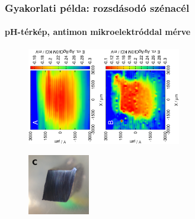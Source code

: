 \documentclass{beamer}
\begin{document}
\begin{frame}
\frametitle{Gyakorlati példa: rozsdásodó szénacél}
\framesubtitle{pH-térkép, antimon mikroelektróddal mérve}
\begin{figure}
\centering
\includegraphics[trim = 10mm 30mm 0mm 10mm, clip, width=0.3\textwidth, angle=-90]{16012906.eps}\includegraphics[trim = 10mm 30mm 0mm 10mm, clip, width=0.3\textwidth, angle=-90]{16012906_deconvoluted.eps}

\includegraphics[width=0.24\textwidth]{cs_cut.jpg}

\end{figure}
\end{frame}
\end{document}

